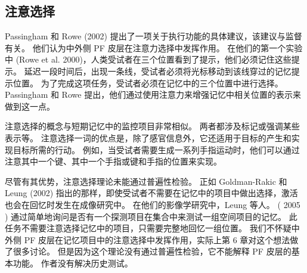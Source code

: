 \subsection{注意选择}
Passingham 和 Rowe (2002) 提出了一项关于执行功能的具体建议，该建议与监督有关。 他们认为中外侧 PF 皮层在注意力选择中发挥作用。 在他们的第一个实验中 (Rowe et al. 2000)，人类受试者在三个位置看到了提示，他们必须记住这些提示。 延迟一段时间后，出现一条线，受试者必须将光标移动到该线穿过的记忆提示位置。 为了完成这项任务，受试者必须在记忆中的三个位置中进行选择。 Passingham 和 Rowe 提出，他们通过使用注意力来增强记忆中相关位置的表示来做到这一点。
\par 
注意选择的概念与短期记忆中的监控项目非常相似。 两者都涉及标记或强调某些表示等。 注意选择一词的优点是，除了感官信息外，它还适用于目标的产生和实现目标所需的行动。 例如，当受试者需要生成一系列手指运动时，他们可以通过注意其中一个键、其中一个手指或键和手指的位置来实现。
\par 
尽管有其优势，注意选择理论未能通过普遍性检验。 正如 Goldman-Rakic 和 Leung (2002) 指出的那样，即使受试者不需要在记忆中的项目中做出选择，激活也会在回忆时发生在成像研究中。 在他们的影像学研究中，Leung 等人。 ( 2005 ) 通过简单地询问是否有一个探测项目在集合中来测试一组空间项目的记忆。 此任务不需要注意选择记忆中的项目，只需要完整地回忆一组位置。 我们不怀疑中外侧 PF 皮层在记忆项目中的注意选择中发挥作用，实际上第 6 章对这个想法做了很多讨论。 但是因为这个理论没有通过普遍性检验，它不能解释 PF 皮层的基本功能。 作者没有解决历史测试。